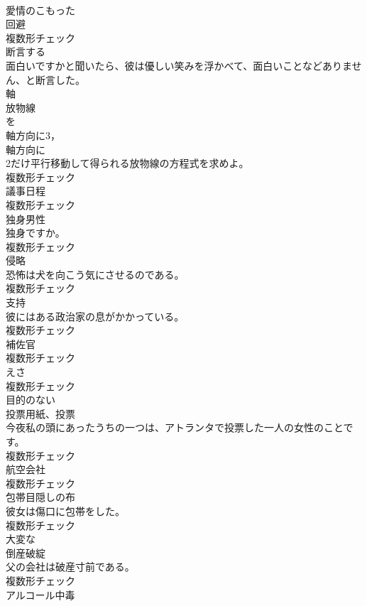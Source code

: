 \documentclass[8pt]{extreport}
\begin{document}
\begin{CJK}{UTF8}{min}
\\	[形容詞]	愛情のこもった	
\\	[名詞]	回避	
\\	複数形チェック
\\	[動詞]	断言する	
\\	面白いですかと聞いたら、彼は優しい笑みを浮かべて、面白いことなどありません、と断言した。	
\\	[名詞]	軸	
\\	放物線 
\\	を
\\	軸方向に3，
\\	軸方向に
\\	2だけ平行移動して得られる放物線の方程式を求めよ。	
\\	複数形チェック
\\	[名詞]	議事日程	
\\	複数形チェック
\\	[名詞]	独身男性	
\\	独身ですか。	
\\	複数形チェック
\\	[名詞]	侵略	
\\	恐怖は犬を向こう気にさせるのである。	
\\	複数形チェック
\\	[名詞]	支持	
\\	彼にはある政治家の息がかかっている。	
\\	複数形チェック
\\	[名詞]	補佐官	
\\	複数形チェック
\\	[名詞]	えさ	
\\	複数形チェック
\\	[形容詞]	目的のない	
\\	[名詞]	投票用紙、投票	
\\	今夜私の頭にあったうちの一つは、アトランタで投票した一人の女性のことです。	
\\	複数形チェック
\\	[名詞]	航空会社	
\\	複数形チェック
\\	[名詞]	包帯目隠しの布	
\\	彼女は傷口に包帯をした。	
\\	複数形チェック
\\	[形容詞]	大変な	
\\	[名詞]	倒産破綻	
\\	父の会社は破産寸前である。	
\\	複数形チェック
\\	[名詞]	アルコール中毒	

\end{CJK}
\end{document}
